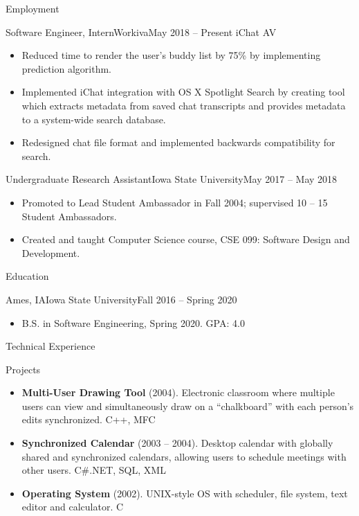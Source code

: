 \documentclass[]{mcdowellcv}
\begin{document}
	\makeheader

	\begin{cvsection}{Employment}
		\begin{cvsubsection}{Software Engineer, Intern}{Workiva}{May 2018 -- Present}
			iChat AV
			\begin{itemize}
				\item Reduced time to render the user’s buddy list by 75\% by implementing prediction algorithm.
				\item Implemented iChat integration with OS X Spotlight Search by creating tool which extracts metadata from saved chat transcripts and provides metadata to a system-wide search database.
				\item Redesigned chat file format and implemented backwards compatibility for search.
			\end{itemize}
		\end{cvsubsection}

		\begin{cvsubsection}{Undergraduate Research Assistant}{Iowa State University}{May 2017 -- May 2018}
			\begin{itemize}
				\item Promoted to Lead Student Ambassador in Fall 2004; supervised 10 -- 15 Student Ambassadors.
				\item Created and taught Computer Science course, CSE 099: Software Design and Development.
			\end{itemize}
		\end{cvsubsection}
	\end{cvsection}

	\begin{cvsection}{Education}
		\begin{cvsubsection}{Ames, IA}{Iowa State University}{Fall 2016 -- Spring 2020}
			\begin{itemize}
				\item B.S. in Software Engineering, Spring 2020. GPA: 4.0
			\end{itemize}
		\end{cvsubsection}
	\end{cvsection}

	\begin{cvsection}{Technical Experience}
		\begin{cvsubsection}{Projects}{}{}
			\begin{itemize}
				\item \textbf{Multi-User Drawing Tool} (2004). Electronic classroom where multiple users can view and simultaneously draw on a “chalkboard” with each person’s edits synchronized.  C++, MFC
				\item \textbf{Synchronized Calendar} (2003 – 2004). Desktop calendar with globally shared and synchronized calendars, allowing users to schedule meetings with other users.  C\#.NET, SQL, XML
				\item \textbf{Operating System} (2002).  UNIX-style OS with scheduler, file system, text editor and calculator. C
			\end{itemize}
		\end{cvsubsection}
	\end{cvsection}
\end{document}
